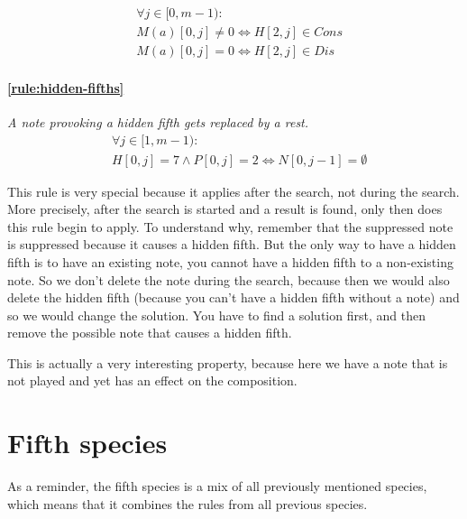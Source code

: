     \begin{equation}
        \begin{aligned}
        &\forall j \in [0, m-1):\\
        &M(a)[0, j] \neq 0 \iff H[2, j] \in Cons\\
        &M(a)[0, j] = 0 \iff H[2, j] \in Dis
        \end{aligned}
    \end{equation}        


    \paragraph{\hspace{.6cm}\ref{rule:hidden-fifths}} \textit{A note provoking a hidden fifth gets replaced by a rest.}
    \begin{equation}
        \begin{aligned}
            &\forall j \in [1, m-1):\\
            &H[0, j] = 7 \land P[0,j] = 2 \iff N[0, j-1] = \emptyset  
        \end{aligned}
    \end{equation}

    This rule is very special because it applies after the search, not during the search. More precisely, after the search is started and a result is found, only then does this rule begin to apply. To understand why, remember that the suppressed note is suppressed because it causes a hidden fifth. But the only way to have a hidden fifth is to have an existing note, you cannot have a hidden fifth to a non-existing note. So we don't delete the note during the search, because then we would also delete the hidden fifth (because you can't have a hidden fifth without a note) and so we would change the solution. You have to find a solution first, and then remove the possible note that causes a hidden fifth. 

    This is actually a very interesting property, because here we have a note that is not played and yet has an effect on the composition.



\section{Fifth species}\label{section:fifth-species}

As a reminder, the fifth species is a mix of all previously mentioned species, which means that it combines the rules from all previous species.

